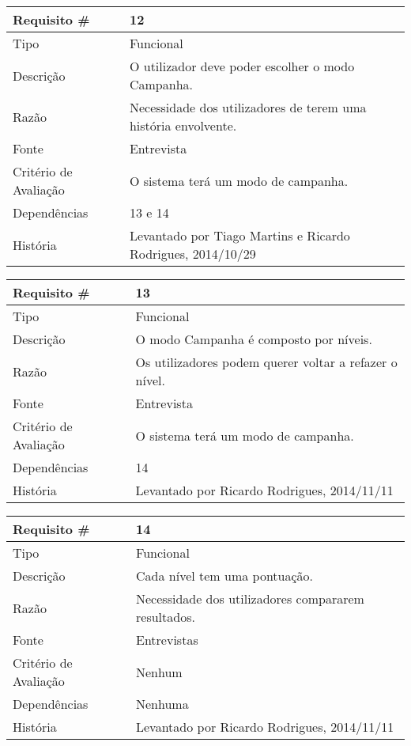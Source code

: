 \begin{tabular} {|l|p{8cm}|} 
\hline
Requisito \# & 12 \\
\hline
Tipo & Funcional \\
\hline
Descrição & O utilizador deve poder escolher o modo Campanha. \\
\hline
Razão & Necessidade dos utilizadores de terem uma história envolvente. \\
\hline
Fonte & Entrevista \\
\hline
Critério de Avaliação & O sistema terá um modo de campanha. \\
\hline
Dependências & 13 e 14 \\
\hline
História & Levantado por Tiago Martins e Ricardo Rodrigues, 2014/10/29 \\
\hline
\end{tabular}

\begin{tabular} {|l|p{8cm}|} 
\hline
Requisito \# & 13 \\
\hline
Tipo & Funcional \\
\hline
Descrição & O modo Campanha é composto por níveis. \\
\hline
Razão & Os utilizadores podem querer voltar a refazer o nível. \\
\hline
Fonte & Entrevista \\
\hline
Critério de Avaliação & O sistema terá um modo de campanha. \\
\hline
Dependências & 14 \\
\hline
História & Levantado por Ricardo Rodrigues, 2014/11/11 \\
\hline
\end{tabular}

\begin{tabular} {|l|p{8cm}|} 
\hline
Requisito \# & 14 \\
\hline
Tipo & Funcional \\
\hline
Descrição & Cada nível tem uma pontuação. \\
\hline
Razão & Necessidade dos utilizadores compararem resultados. \\
\hline
Fonte & Entrevistas \\
\hline
Critério de Avaliação & Nenhum \\
\hline
Dependências & Nenhuma \\
\hline
História & Levantado por Ricardo Rodrigues, 2014/11/11 \\
\hline
\end{tabular}

